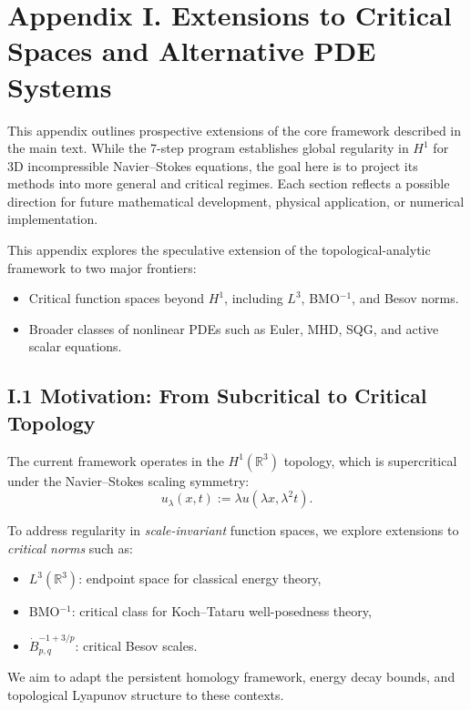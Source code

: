 \documentclass[11pt]{article}
\theoremstyle{definition}
\begin{document}
\section*{Appendix I. Extensions to Critical Spaces and Alternative PDE Systems}

This appendix outlines prospective extensions of the core framework described in the main text. While the 7-step program establishes global regularity in $H^1$ for 3D incompressible Navier–Stokes equations, the goal here is to project its methods into more general and critical regimes. Each section reflects a possible direction for future mathematical development, physical application, or numerical implementation.

This appendix explores the speculative extension of the topological-analytic framework to two major frontiers:


\begin{itemize}
  \item Critical function spaces beyond $H^1$, including $L^3$, BMO$^{-1}$, and Besov norms.
  \item Broader classes of nonlinear PDEs such as Euler, MHD, SQG, and active scalar equations.
\end{itemize}

\subsection*{I.1 Motivation: From Subcritical to Critical Topology}

The current framework operates in the $H^1(\mathbb{R}^3)$ topology, which is supercritical under the Navier--Stokes scaling symmetry:
\[ u_\lambda(x, t) := \lambda u(\lambda x, \lambda^2 t). \]

To address regularity in \emph{scale-invariant} function spaces, we explore extensions to \emph{critical norms} such as:

\begin{itemize}
  \item $L^3(\mathbb{R}^3)$: endpoint space for classical energy theory,
  \item BMO$^{-1}$: critical class for Koch--Tataru well-posedness theory,
  \item $\dot{B}^{-1+3/p}_{p,q}$: critical Besov scales.
\end{itemize}

We aim to adapt the persistent homology framework, energy decay bounds, and topological Lyapunov structure to these contexts.
\end{document}
